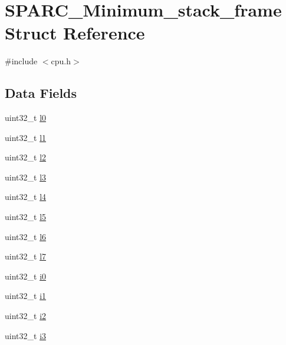 \hypertarget{structSPARC__Minimum__stack__frame}{}\section{S\+P\+A\+R\+C\+\_\+\+Minimum\+\_\+stack\+\_\+frame Struct Reference}
\label{structSPARC__Minimum__stack__frame}


{\ttfamily \#include $<$cpu.\+h$>$}

\subsection*{Data Fields}
\begin{DoxyCompactItemize}
\item 
uint32\+\_\+t \mbox{\hyperlink{structSPARC__Minimum__stack__frame_a4ba3dca113cde4fa11e9ceaf417ba2a6}{l0}}
\item 
uint32\+\_\+t \mbox{\hyperlink{structSPARC__Minimum__stack__frame_a53b008e7da369d1d8e9a02b0f74ace25}{l1}}
\item 
uint32\+\_\+t \mbox{\hyperlink{structSPARC__Minimum__stack__frame_a8f9016d647c0352d51c43e1d97b9695e}{l2}}
\item 
uint32\+\_\+t \mbox{\hyperlink{structSPARC__Minimum__stack__frame_a507ead3ccbbffd3e54b51dcb9598a912}{l3}}
\item 
uint32\+\_\+t \mbox{\hyperlink{structSPARC__Minimum__stack__frame_af960ce2066da5987dff1068f1bb4c127}{l4}}
\item 
uint32\+\_\+t \mbox{\hyperlink{structSPARC__Minimum__stack__frame_ae879ebc1985a0685092a7566caa366ef}{l5}}
\item 
uint32\+\_\+t \mbox{\hyperlink{structSPARC__Minimum__stack__frame_ace8c3088fdfd42a00967ceace01ce9da}{l6}}
\item 
uint32\+\_\+t \mbox{\hyperlink{structSPARC__Minimum__stack__frame_a0832f1df9eb415879f7009a7a6f644c7}{l7}}
\item 
uint32\+\_\+t \mbox{\hyperlink{structSPARC__Minimum__stack__frame_a60aa3fb27daf17cce5f9bdbbd2c8b80e}{i0}}
\item 
uint32\+\_\+t \mbox{\hyperlink{structSPARC__Minimum__stack__frame_ae496e9b2f2d8ffebb140a6c4391d23b5}{i1}}
\item 
uint32\+\_\+t \mbox{\hyperlink{structSPARC__Minimum__stack__frame_a497c1ea85490fe5047b74e4561adf8cd}{i2}}
\item 
uint32\+\_\+t \mbox{\hyperlink{structSPARC__Minimum__stack__frame_a6fcc0100fee2c06c06e30094b698e35f}{i3}}

\end{DoxyCompactItemize}
